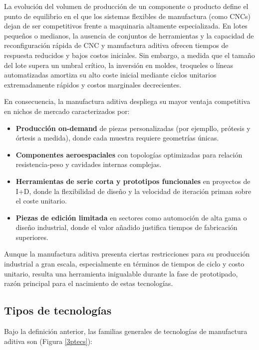 La evolución del volumen de producción de un componente o producto define el punto de equilibrio en el que los sistemas flexibles de manufactura (como CNCs) dejan de ser competitivos frente a maquinaria altamente especializada. En lotes pequeños o medianos, la ausencia de conjuntos de herramientas y la capacidad de reconfiguración rápida de CNC y manufactura aditiva ofrecen tiempos de respuesta reducidos y bajos costos iniciales. Sin embargo, a medida que el tamaño del lote supera un umbral crítico, la inversión en moldes, troqueles o líneas automatizadas amortiza su alto coste inicial mediante ciclos unitarios extremadamente rápidos y costos marginales decrecientes.  

En consecuencia, la manufactura aditiva despliega su mayor ventaja competitiva en nichos de mercado caracterizados por:

\begin{itemize}
  \item \textbf{Producción on-demand} de piezas personalizadas (por ejempllo, prótesis y órtesis a medida), donde cada muestra requiere geometrías únicas.  
  \item \textbf{Componentes aeroespaciales} con topologías optimizadas para relación resistencia-peso y cavidades internas complejas.  
  \item \textbf{Herramientas de serie corta y prototipos funcionales} en proyectos de I+D, donde la flexibilidad de diseño y la velocidad de iteración priman sobre el coste unitario.  
  \item \textbf{Piezas de edición limitada} en sectores como automoción de alta gama o diseño industrial, donde el valor añadido justifica tiempos de fabricación superiores.
\end{itemize}  

Aunque la manufactura aditiva presenta ciertas restricciones para su producción industrial a gran escala, especialmente en términos de tiempos de ciclo y costo unitario, resulta una herramienta inigualable durante la fase de prototipado, razón principal para el nacimiento de estas tecnologías.

\subsection{Tipos de tecnologías}

Bajo la definición anterior, las familias generales de tecnologías de manufactura aditiva son (Figura \ref{3ptecs}):

